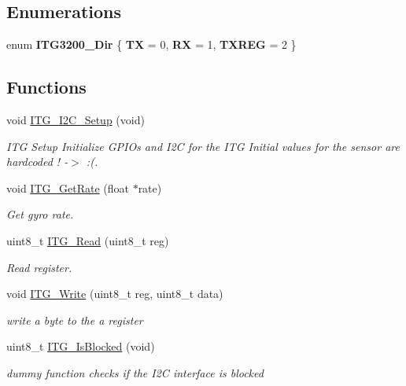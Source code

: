 \subsection*{Enumerations}
\begin{DoxyCompactItemize}
\item 
enum {\bfseries ITG3200\_\-Dir} \{ {\bfseries TX} =  0, 
{\bfseries RX} =  1, 
{\bfseries TXREG} =  2
 \}
\end{DoxyCompactItemize}
\subsection*{Functions}
\begin{DoxyCompactItemize}
\item 
void \hyperlink{group___i_t_g3200_ga497272b2596c5d27858802b6cbb7e9f4}{ITG\_\-I2C\_\-Setup} (void)
\begin{DoxyCompactList}\small\item\em ITG Setup Initialize GPIOs and I2C for the ITG Initial values for the sensor are hardcoded ! -\/$>$ :(. \item\end{DoxyCompactList}\item 
void \hyperlink{group___i_t_g3200_ga458fdff1250869d0a7bd7dda2f72f8d9}{ITG\_\-GetRate} (float $\ast$rate)
\begin{DoxyCompactList}\small\item\em Get gyro rate. \item\end{DoxyCompactList}\item 
uint8\_\-t \hyperlink{group___i_t_g3200_gae06e53cf5ddc3e91b4d746dc150d794f}{ITG\_\-Read} (uint8\_\-t reg)
\begin{DoxyCompactList}\small\item\em Read register. \item\end{DoxyCompactList}\item 
void \hyperlink{group___i_t_g3200_ga6fb85cf229bd2de86ee79c5509ea628e}{ITG\_\-Write} (uint8\_\-t reg, uint8\_\-t data)
\begin{DoxyCompactList}\small\item\em write a byte to the a register \item\end{DoxyCompactList}\item 
\hypertarget{group___i_t_g3200_ga4ebf114ea534d7a854f8c48bf53d6e3c}{
uint8\_\-t \hyperlink{group___i_t_g3200_ga4ebf114ea534d7a854f8c48bf53d6e3c}{ITG\_\-IsBlocked} (void)}
\label{group___i_t_g3200_ga4ebf114ea534d7a854f8c48bf53d6e3c}

\begin{DoxyCompactList}\small\item\em dummy function checks if the I2C interface is blocked \item\end{DoxyCompactList}\end{DoxyCompactItemize}



